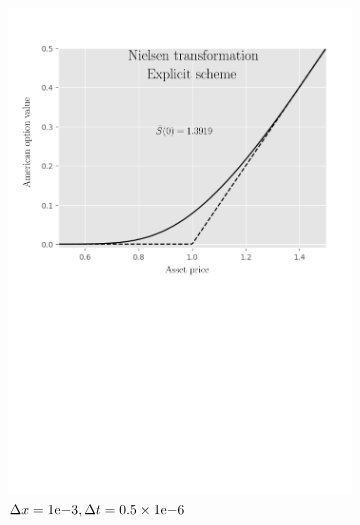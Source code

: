 \begin{figure}[H]
\begin{subfigure}{0.4\textwidth}
    \includegraphics[width=\textwidth]{chapters/chapter3/TestCase3ExplicitNielsen.pdf}
    \caption{$\Delta{x}={1}\mathrm{e}{-3}, \Delta{t}=0.5\times{1}\mathrm{e}{-6}$}
    \label{fig:finitedifferencesschemes:numericaresults:test_case_3_explicit_nielsen}
  \end{subfigure}
  \hspace{0.5cm}
  \begin{subfigure}{0.4\textwidth}
    \label{fig:finitedifferencesschemes:numericaresults:test_case_3_implicit_nielsen}
    \centering

\end{subfigure}
\end{figure}
